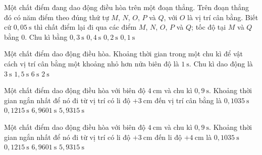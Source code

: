 \begin{ex}
Một chất điểm đang dao động điều hòa trên một đoạn thẳng. Trên đoạn thẳng đó có năm điểm theo đúng thứ tự $M$, $N$, $O$, $P$ và $Q$, với $O$ là vị trí cân bằng. Biết cứ $0,05\ \text{s}$ thì chất điểm lại đi qua các điểm $M$, $N$, $O$, $P$ và $Q$; tốc độ tại $M$ và $Q$ bằng $0$. Chu kì bằng
\choice
{$0,3\ \text{s}$}
{\True $0,4\ \text{s}$}
{$0,2\ \text{s}$}
{$0,1\ \text{s}$}
\end{ex}

\begin{ex}
Một chất điểm dao động điều hòa. Khoảng thời gian trong một chu kì để vật cách vị trí cân bằng một khoảng nhỏ hơn nửa biên độ là $1\ \text{s}$. Chu kì dao động là
\choice
{\True $3\ \text{s}$}
{$1,5\ \text{s}$}
{$6\ \text{s}$}
{$2\ \text{s}$}
\end{ex}

\begin{ex}
Một chất điểm dao động điều hòa với biên độ $4\ \text{cm}$ và chu kì $0,9\ \text{s}$. Khoảng thời gian ngắn nhất để nó đi từ vị trí có li độ $+3\ \text{cm}$ đến vị trí cân bằng là
\choice
{$0,1035\ \text{s}$}
{\True $0,1215\ \text{s}$}
{$6,9601\ \text{s}$}
{$5,9315\ \text{s}$}
\end{ex}

\begin{ex}
Một chất điểm dao động điều hòa với biên độ $4\ \text{cm}$ và chu kì $0,9\ \text{s}$. Khoảng thời gian ngắn nhất để nó đi từ vị trí có li độ $+3\ \text{cm}$ đến li độ $+4\ \text{cm}$ là
\choice
{\True $0,1035\ \text{s}$}
{$0,1215\ \text{s}$}
{$6,9601\ \text{s}$}
{$5,9315\ \text{s}$}
\end{ex}

